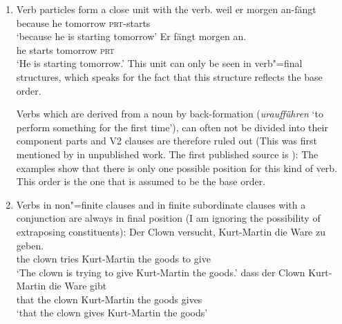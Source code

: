 \begin{enumerate}
\item Verb particles form a close unit with the verb.
\eal
\ex 
\gll weil er morgen an-fängt\\
     because he tomorrow \textsc{prt}-starts\\
\glt `because he is starting tomorrow'
\ex 
\gll Er fängt morgen an.\\
	 he starts tomorrow \textsc{prt}\\
\glt `He is starting tomorrow.'
\zl
This unit can only be seen in verb"=final structures, which speaks for the fact that this structure
reflects the base order.

Verbs which are derived from a noun by back-formation (\eg \emph{uraufführen} 
`to perform something for the first time'), can often not be divided into their component parts and
V2 clauses are therefore ruled out (This was first mentioned by \citet{Hoehle91b} in unpublished
work. The first published source is ):
\eal
{}
\zl
The examples show that there is only one possible position for this kind of verb. This order is the one that is assumed to be the base order.
\item Verbs in non"=finite clauses and in finite subordinate clauses with a conjunction are
always in final position (I am ignoring the possibility of extraposing constituents):
\eal
\ex 
\gll Der Clown versucht, Kurt-Martin die Ware zu geben.\\
     the clown tries Kurt-Martin the goods to give\\
\glt `The clown is trying to give Kurt-Martin the goods.'
\ex 
\gll dass der Clown Kurt-Martin die Ware gibt\\
	 that the clown Kurt-Martin the goods gives\\
\glt `that the clown gives Kurt-Martin the goods'
\zl


\end{enumerate}
